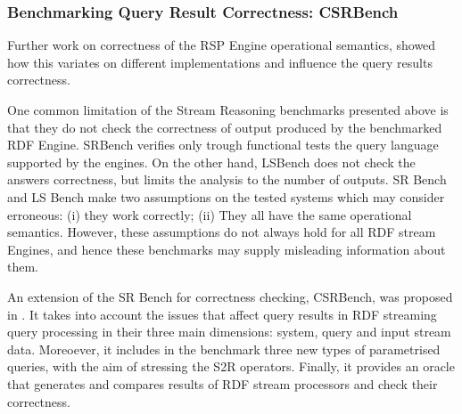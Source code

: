 \subsubsection{Benchmarking Query Result Correctness: CSRBench}

Further work on correctness of the RSP Engine operational semantics, showed how this variates on different implementations and influence the query results correctness. \cite{DBLP:conf/semweb/DellAglioCBCV13}

One common limitation of the Stream Reasoning benchmarks presented above is that they do not check the correctness of output produced by the benchmarked RDF Engine. SRBench verifies only trough functional tests the query language supported by the engines. On the other hand, LSBench does not check the answers correctness, but limits the analysis to the number of outputs. 
SR Bench and LS Bench make two assumptions on the tested systems which may consider erroneous: (i) they work correctly; (ii) They all have the same operational semantics. However, these assumptions do not always hold for all RDF stream Engines, and hence these benchmarks may supply misleading information about them.
 
An extension of the SR Bench for correctness checking, CSRBench, was proposed in \cite{DBLP:conf/semweb/DellAglioCBCV13}. It takes into account the issues that affect query results in RDF streaming query processing in their three main dimensions: system, query and input stream data. Moreoever, it includes in the benchmark three new types of parametrised queries, with the aim of stressing the S2R operators. Finally, it provides an oracle that generates and compares results of RDF stream processors and check their correctness.